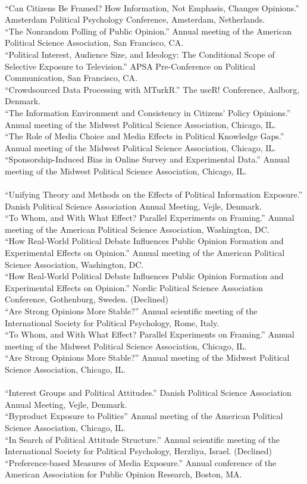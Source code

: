 \documentclass[12pt]{article}
\newcommand{\topic}[1]{\pagebreak[3]\indent {\color{lg}{\footnotesize #1 }}\\}
\newcommand{\entry}[1]{\indent {\color{lg}\guillemotright}\hspace{2pt}#1\vspace{.25em}\\}
\begin{document}
	\topic{Conference Papers (2015)}
	\entry{``Can Citizens Be Framed? How Information, Not Emphasis, Changes Opinions.'' Amsterdam Political Psychology Conference, Amsterdam, Netherlands.}
	\entry{``The Nonrandom Polling of Public Opinion.'' Annual meeting of the American Political Science Association, San Francisco, CA.}
	\entry{``Political Interest, Audience Size, and Ideology: The Conditional Scope of Selective Exposure to Television.'' APSA Pre-Conference on Political Communication, San Francisco, CA.}
	\entry{``Crowdsourced Data Processing with MTurkR.'' The useR! Conference, Aalborg, Denmark.}
	\entry{``The Information Environment and Consistency in Citizens' Policy Opinions.'' Annual meeting of the Midwest Political Science Association, Chicago, IL.}
	\entry{``The Role of Media Choice and Media Effects in Political Knowledge Gaps.'' Annual meeting of the Midwest Political Science Association, Chicago, IL.}
	\entry{``Sponsorship-Induced Bias in Online Survey and Experimental Data.'' Annual meeting of the Midwest Political Science Association, Chicago, IL.}
	
	\topic{Conference Papers (2014)}
	\entry{``Unifying Theory and Methods on the Effects of Political Information Exposure.'' Danish Political Science Association Annual Meeting, Vejle, Denmark.}
	\entry{``To Whom, and With What Effect? Parallel Experiments on Framing.'' Annual meeting of the American Political Science Association, Washington, DC.}
	\entry{``How Real-World Political Debate Influences Public Opinion Formation and Experimental Effects on Opinion.'' Annual meeting of the American Political Science Association, Washington, DC.}
	\entry{``How Real-World Political Debate Influences Public Opinion Formation and Experimental Effects on Opinion.'' Nordic Political Science Association Conference, Gothenburg, Sweden. (Declined)}
	\entry{``Are Strong Opinions More Stable?'' Annual scientific meeting of the International Society for Political Psychology, Rome, Italy.}
	\entry{``To Whom, and With What Effect? Parallel Experiments on Framing.'' Annual meeting of the Midwest Political Science Association, Chicago, IL.}
	\entry{``Are Strong Opinions More Stable?'' Annual meeting of the Midwest Political Science Association, Chicago, IL.}
	
	\topic{Conference Papers (2013)}
	\entry{``Interest Groups and Political Attitudes.'' Danish Political Science Association Annual Meeting, Vejle, Denmark.}
	\entry{``Byproduct Exposure to Politics'' Annual meeting of the American Political Science Association, Chicago, IL.}
	\entry{``In Search of Political Attitude Structure.'' Annual scientific meeting of the International Society for Political Psychology, Herzliya, Israel. (Declined)}
	\entry{``Preference-based Measures of Media Exposure.'' Annual conference of the American Association for Public Opinion Research, Boston, MA.}
	
\end{document}
